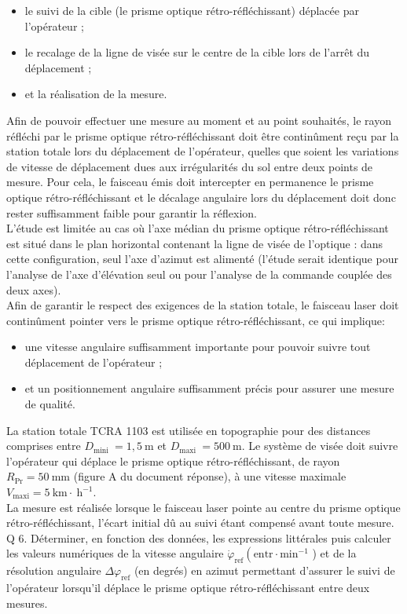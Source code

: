 \documentclass[10pt]{article}
\begin{document}
\begin{itemize}
  \item le suivi de la cible (le prisme optique rétro-réfléchissant) déplacée par l'opérateur ;
  \item le recalage de la ligne de visée sur le centre de la cible lors de l'arrêt du déplacement ;
  \item et la réalisation de la mesure.
\end{itemize}

Afin de pouvoir effectuer une mesure au moment et au point souhaités, le rayon réfléchi par le prisme optique rétro-réfléchissant doit être continûment reçu par la station totale lors du déplacement de l'opérateur, quelles que soient les variations de vitesse de déplacement dues aux irrégularités du sol entre deux points de mesure. Pour cela, le faisceau émis doit intercepter en permanence le prisme optique rétro-réfléchissant et le décalage angulaire lors du déplacement doit donc rester suffisamment faible pour garantir la réflexion.\\
L'étude est limitée au cas où l'axe médian du prisme optique rétro-réfléchissant est situé dans le plan horizontal contenant la ligne de visée de l'optique : dans cette configuration, seul l'axe d'azimut est alimenté (l'étude serait identique pour l'analyse de l'axe d'élévation seul ou pour l'analyse de la commande couplée des deux axes).\\
Afin de garantir le respect des exigences de la station totale, le faisceau laser doit continûment pointer vers le prisme optique rétro-réfléchissant, ce qui implique:

\begin{itemize}
  \item une vitesse angulaire suffisamment importante pour pouvoir suivre tout déplacement de l'opérateur ;
  \item et un positionnement angulaire suffisamment précis pour assurer une mesure de qualité.
\end{itemize}

La station totale TCRA 1103 est utilisée en topographie pour des distances comprises entre $D_{\text {mini }}=1,5 \mathrm{~m}$ et $D_{\text {maxi }}=500 \mathrm{~m}$. Le système de visée doit suivre l'opérateur qui déplace le prisme optique rétro-réfléchissant, de rayon $R_{\mathrm{Pr}}=50 \mathrm{~mm}$ (figure A du document réponse), à une vitesse maximale $V_{\mathrm{maxi}}=5 \mathrm{~km} \cdot \mathrm{~h}^{-1}$.\\
La mesure est réalisée lorsque le faisceau laser pointe au centre du prisme optique rétro-réfléchissant, l'écart initial dû au suivi étant compensé avant toute mesure.\\
Q 6. Déterminer, en fonction des données, les expressions littérales puis calculer les valeurs numériques de la vitesse angulaire $\dot{\varphi}_{\mathrm{ref}}\left(\mathrm{entr} \cdot \mathrm{min}^{-1}\right.$ ) et de la résolution angulaire $\Delta \varphi_{\mathrm{ref}}$ (en degrés) en azimut permettant d'assurer le suivi de l'opérateur lorsqu'il déplace le prisme optique rétro-réfléchissant entre deux mesures.
\end{document}
